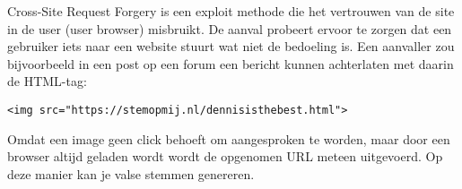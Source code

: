 Cross-Site Request Forgery is een exploit methode die het vertrouwen van de site in de user (user browser) misbruikt. De aanval probeert ervoor te zorgen dat een gebruiker iets naar een website stuurt wat niet de bedoeling is. Een aanvaller zou bijvoorbeeld in een post op een forum een bericht kunnen achterlaten met daarin de HTML-tag:
\begin{lstlisting}
<img src="https://stemopmij.nl/dennisisthebest.html">
\end{lstlisting}
Omdat een image geen click behoeft om aangesproken te worden, maar door een browser altijd geladen wordt wordt de opgenomen URL meteen uitgevoerd. Op deze manier kan je valse stemmen genereren.
